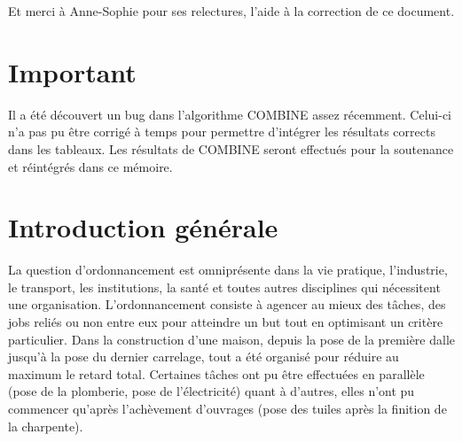 \documentclass[a4paper,12pt]{report}
\theoremstyle{plain}				%
\theoremstyle{definition}				%
\newcommand{\lp}[1]{\todo[author=LP,color=yellow,inline]{#1}}
\begin{document}
Et merci à Anne-Sophie pour ses relectures, l'aide à la correction de ce document.

\section*{Important}
Il a été découvert un bug dans l'algorithme COMBINE assez récemment. Celui-ci n'a pas pu être corrigé à temps pour permettre d'intégrer les résultats corrects dans les tableaux.
Les résultats de COMBINE seront effectués pour la soutenance et réintégrés dans ce mémoire.
 


%
%
%
\renewcommand{\thesection}{\arabic{section}}
\renewcommand{\contentsname}{Sommaire}
\setcounter{tocdepth}{3}	%
\setcounter{secnumdepth}{3}	%
\tableofcontents


\bigskip


\section{Introduction générale} \label{sec:introductionGenerale}


La question d’ordonnancement est omniprésente dans la vie pratique, l'industrie, le transport, 
  les institutions, la santé et toutes autres disciplines qui nécessitent une organisation.
  L'ordonnancement consiste à agencer au mieux des tâches, des jobs reliés ou non entre eux 
  pour atteindre un but tout en optimisant un critère particulier. 
Dans la construction d'une maison, depuis la pose de la première dalle jusqu'à la pose du dernier carrelage, 
  tout a été organisé pour réduire au maximum le retard total. 
  Certaines tâches ont pu être effectuées en parallèle (pose de la plomberie, pose de l'électricité)  
  quant à d'autres, elles n'ont pu commencer qu'après l'achèvement d'ouvrages 
  (pose des tuiles après la finition de la charpente). 
\end{document}
